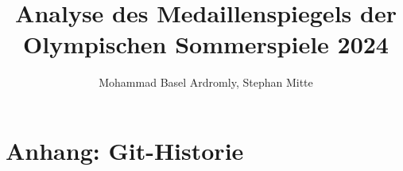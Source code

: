 \documentclass[usegeometry=true]{scrartcl}
\begin{document}
\subject{Projektbericht zum Modul Information Retrieval und Visualisierung Sommersemester 2025}
\title{Analyse des Medaillenspiegels der Olympischen Sommerspiele 2024}
\author{Mohammad Basel Ardromly, Stephan Mitte}
\maketitle









\section*{Anhang: Git-Historie}
\end{document}
